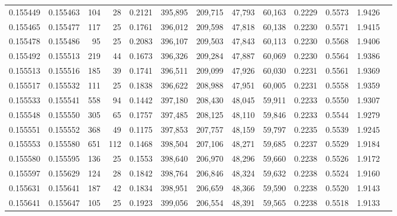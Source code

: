 \begin{tabular}{rrrrrrrrrrrrr}
0.155449 & 0.155463 &   104 &  28 &                                     0.2121 & 395,895 & 209,715 &  47,793 &  60,163 & 0.2229 & 0.5573 & 1.9426 \\
0.155465 & 0.155477 &   117 &  25 &                                     0.1761 & 396,012 & 209,598 &  47,818 &  60,138 & 0.2230 & 0.5571 & 1.9415 \\
0.155478 & 0.155486 &    95 &  25 &                                     0.2083 & 396,107 & 209,503 &  47,843 &  60,113 & 0.2230 & 0.5568 & 1.9406 \\
0.155492 & 0.155513 &   219 &  44 &                                     0.1673 & 396,326 & 209,284 &  47,887 &  60,069 & 0.2230 & 0.5564 & 1.9386 \\
0.155513 & 0.155516 &   185 &  39 &                                     0.1741 & 396,511 & 209,099 &  47,926 &  60,030 & 0.2231 & 0.5561 & 1.9369 \\
0.155517 & 0.155532 &   111 &  25 &                                     0.1838 & 396,622 & 208,988 &  47,951 &  60,005 & 0.2231 & 0.5558 & 1.9359 \\
0.155533 & 0.155541 &   558 &  94 &                                     0.1442 & 397,180 & 208,430 &  48,045 &  59,911 & 0.2233 & 0.5550 & 1.9307 \\
0.155548 & 0.155550 &   305 &  65 &                                     0.1757 & 397,485 & 208,125 &  48,110 &  59,846 & 0.2233 & 0.5544 & 1.9279 \\
0.155551 & 0.155552 &   368 &  49 &                                     0.1175 & 397,853 & 207,757 &  48,159 &  59,797 & 0.2235 & 0.5539 & 1.9245 \\
0.155553 & 0.155580 &   651 & 112 &                                     0.1468 & 398,504 & 207,106 &  48,271 &  59,685 & 0.2237 & 0.5529 & 1.9184 \\
0.155580 & 0.155595 &   136 &  25 &                                     0.1553 & 398,640 & 206,970 &  48,296 &  59,660 & 0.2238 & 0.5526 & 1.9172 \\
0.155597 & 0.155629 &   124 &  28 &                                     0.1842 & 398,764 & 206,846 &  48,324 &  59,632 & 0.2238 & 0.5524 & 1.9160 \\
0.155631 & 0.155641 &   187 &  42 &                                     0.1834 & 398,951 & 206,659 &  48,366 &  59,590 & 0.2238 & 0.5520 & 1.9143 \\
0.155641 & 0.155647 &   105 &  25 &                                     0.1923 & 399,056 & 206,554 &  48,391 &  59,565 & 0.2238 & 0.5518 & 1.9133 \\

\end{tabular}
